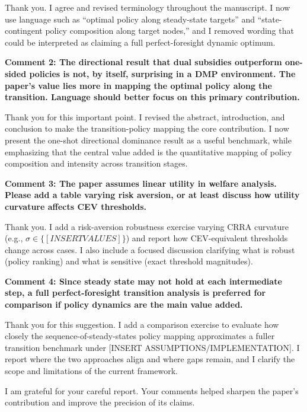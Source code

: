 \documentclass[12pt]{article}
\begin{document}
\begin{onehalfspacing}
\medskip

Thank you. I agree and revised terminology throughout the manuscript. I now use language such as ``optimal policy along steady-state targets'' and ``state-contingent policy composition along target nodes,'' and I removed wording that could be interpreted as claiming a full perfect-foresight dynamic optimum.

\bigskip
\bigskip

\textbf{Comment 2: The directional result that dual subsidies outperform one-sided policies is not, by itself, surprising in a DMP environment. The paper's value lies more in mapping the optimal policy along the transition. Language should better focus on this primary contribution.}

\medskip

Thank you for this important point. I revised the abstract, introduction, and conclusion to make the transition-policy mapping the core contribution. I now present the one-shot directional dominance result as a useful benchmark, while emphasizing that the central value added is the quantitative mapping of policy composition and intensity across transition stages.

\bigskip
\bigskip

\textbf{Comment 3: The paper assumes linear utility in welfare analysis. Please add a table varying risk aversion, or at least discuss how utility curvature affects CEV thresholds.}

\medskip

Thank you. I add a risk-aversion robustness exercise varying CRRA curvature (e.g., $\sigma \in \{[INSERT VALUES]\}$) and report how CEV-equivalent thresholds change across cases. I also include a focused discussion clarifying what is robust (policy ranking) and what is sensitive (exact threshold magnitudes).

\bigskip
\bigskip

\textbf{Comment 4: Since steady state may not hold at each intermediate step, a full perfect-foresight transition analysis is preferred for comparison if policy dynamics are the main value added.}

\medskip

Thank you for this suggestion. I add a comparison exercise to evaluate how closely the sequence-of-steady-states policy mapping approximates a fuller transition benchmark under [INSERT ASSUMPTIONS/IMPLEMENTATION]. I report where the two approaches align and where gaps remain, and I clarify the scope and limitations of the current framework.

\bigskip

I am grateful for your careful report. Your comments helped sharpen the paper's contribution and improve the precision of its claims.

\end{onehalfspacing}
\end{document}

